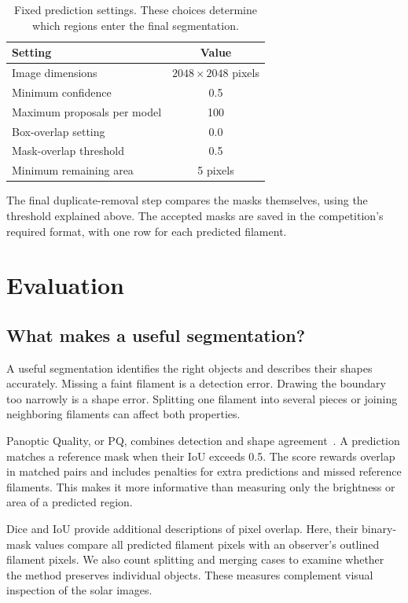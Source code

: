 \documentclass[sigconf]{acmart}
\begin{document}
\begin{table}[t]
\caption{Fixed prediction settings. These choices determine which regions enter the final segmentation.}
\centering\small
\begin{tabular}{lc}\toprule
Setting & Value\\\midrule
Image dimensions & $2048\times2048$ pixels\\
Minimum confidence & 0.5\\
Maximum proposals per model & 100\\
Box-overlap setting & 0.0\\
Mask-overlap threshold & 0.5\\
Minimum remaining area & 5 pixels\\\bottomrule
\end{tabular}
\end{table}

The final duplicate-removal step compares the masks themselves, using the threshold explained above.
The accepted masks are saved in the competition's required format, with one row for each predicted filament.

\section{Evaluation}\label{sec:evaluation}
\subsection{What makes a useful segmentation?}
A useful segmentation identifies the right objects and describes their shapes accurately.
Missing a faint filament is a detection error. Drawing the boundary too narrowly is a shape error.
Splitting one filament into several pieces or joining neighboring filaments can affect both properties.


Panoptic Quality, or PQ, combines detection and shape agreement~\cite{kirillov2019}. A prediction matches a reference mask when their IoU exceeds 0.5.
The score rewards overlap in matched pairs and includes penalties for extra predictions and missed reference filaments.
This makes it more informative than measuring only the brightness or area of a predicted region.


Dice and IoU provide additional descriptions of pixel overlap. Here, their binary-mask values compare all predicted filament pixels with an observer's outlined filament pixels.
We also count splitting and merging cases to examine whether the method preserves individual objects.
These measures complement visual inspection of the solar images.
\end{document}
